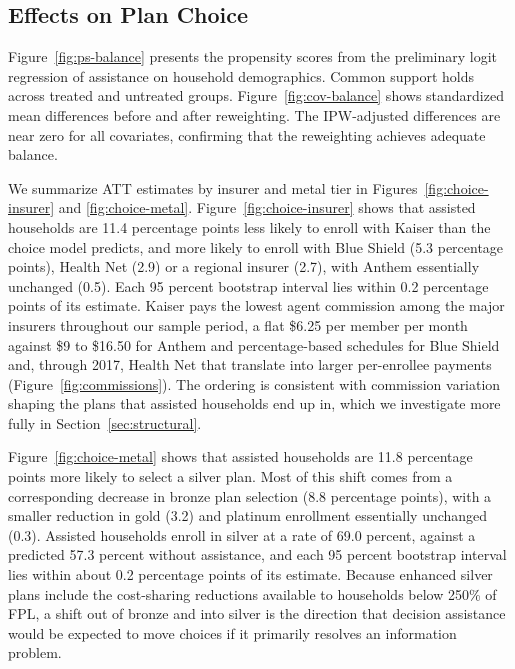 \documentclass[12pt]{article}
\begin{document}
\subsection{Effects on Plan Choice}
\label{subsec:causal-results}

Figure~\ref{fig:ps-balance} presents the propensity scores from the preliminary logit regression of assistance on household demographics. Common support holds across treated and untreated groups. Figure~\ref{fig:cov-balance} shows standardized mean differences before and after reweighting. The IPW-adjusted differences are near zero for all covariates, confirming that the reweighting achieves adequate balance.

We summarize ATT estimates by insurer and metal tier in Figures~\ref{fig:choice-insurer} and \ref{fig:choice-metal}. Figure~\ref{fig:choice-insurer} shows that assisted households are 11.4 percentage points less likely to enroll with Kaiser than the choice model predicts, and more likely to enroll with Blue Shield (5.3 percentage points), Health Net (2.9) or a regional insurer (2.7), with Anthem essentially unchanged (0.5). Each 95 percent bootstrap interval lies within 0.2 percentage points of its estimate. Kaiser pays the lowest agent commission among the major insurers throughout our sample period, a flat \$6.25 per member per month against \$9 to \$16.50 for Anthem and percentage-based schedules for Blue Shield and, through 2017, Health Net that translate into larger per-enrollee payments (Figure~\ref{fig:commissions}). The ordering is consistent with commission variation shaping the plans that assisted households end up in, which we investigate more fully in Section~\ref{sec:structural}.

Figure~\ref{fig:choice-metal} shows that assisted households are 11.8 percentage points more likely to select a silver plan. Most of this shift comes from a corresponding decrease in bronze plan selection (8.8 percentage points), with a smaller reduction in gold (3.2) and platinum enrollment essentially unchanged (0.3). Assisted households enroll in silver at a rate of 69.0 percent, against a predicted 57.3 percent without assistance, and each 95 percent bootstrap interval lies within about 0.2 percentage points of its estimate. Because enhanced silver plans include the cost-sharing reductions available to households below 250\% of FPL, a shift out of bronze and into silver is the direction that decision assistance would be expected to move choices if it primarily resolves an information problem.
\end{document}
